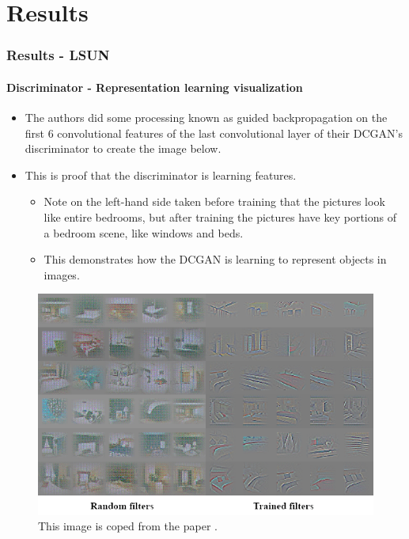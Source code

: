 \documentclass{beamer}
\begin{document}

\section{Results}
\begin{frame}[allowframebreaks]
\frametitle{Results - LSUN}
\framesubtitle{Discriminator -  Representation learning visualization}
\begin{itemize}
\item The authors did some processing known as guided backpropagation on the
first 6 convolutional features of the last convolutional layer of their DCGAN's
discriminator to create the image below.  

\item This is proof that the discriminator  is learning features.  
  \begin{itemize} 
  \item Note on the
  left-hand side taken before training that the pictures look like entire bedrooms,
  but after training the pictures have key portions of a bedroom scene, like windows
  and beds.
  \item This demonstrates how the DCGAN is learning to represent objects in
  images.
  \end{itemize}
\end{itemize}
\begin{figure}
\includegraphics[scale=0.35] {feature-maps}
\caption{This image is coped from the paper \cite{repLearnDcgan}.}
\end{figure}
\end{frame}


\end{document}
